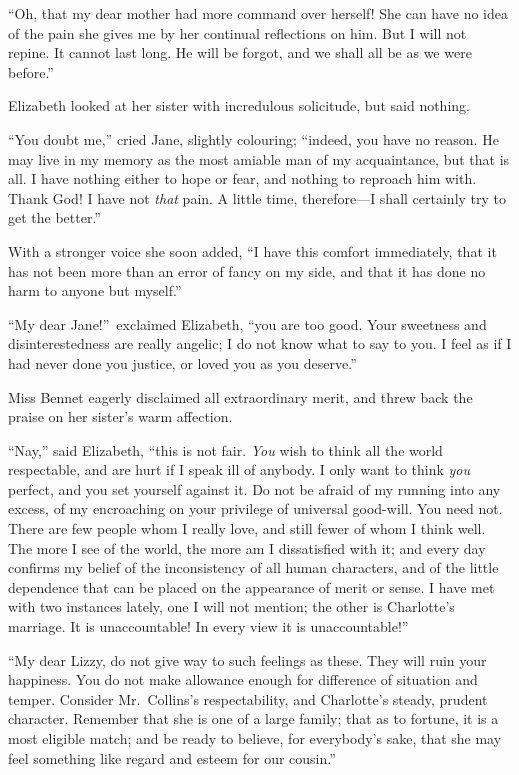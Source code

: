 \documentclass[12pt,english]{book}
\begin{document}
{}``Oh, that my dear mother had more command over herself! She can
have no idea of the pain she gives me by her continual reflections
on him. But I will not repine. It cannot last long. He will be forgot,
and we shall all be as we were before.''

Elizabeth looked at her sister with incredulous solicitude, but said
nothing.

{}``You doubt me,'' cried Jane, slightly colouring; {}``indeed,
you have no reason. He may live in my memory as the most amiable man
of my acquaintance, but that is all. I have nothing either to hope
or fear, and nothing to reproach him with. Thank God! I have not \textit{that}
pain. A little time, therefore\mbox{---}I shall certainly try to
get the better.''

With a stronger voice she soon added, {}``I have this comfort immediately,
that it has not been more than an error of fancy on my side, and that
it has done no harm to anyone but myself.''

{}``My dear Jane!''\ exclaimed Elizabeth, {}``you are too good.
Your sweetness and disinterestedness are really angelic; I do not
know what to say to you. I feel as if I had never done you justice,
or loved you as you deserve.''

Miss Bennet eagerly disclaimed all extraordinary merit, and threw
back the praise on her sister's warm affection.

{}``Nay,'' said Elizabeth, {}``this is not fair. \textit{You} wish
to think all the world respectable, and are hurt if I speak ill of
anybody. I only want to think \textit{you} perfect, and you set yourself
against it. Do not be afraid of my running into any excess, of my
encroaching on your privilege of universal good-will. You need not.
There are few people whom I really love, and still fewer of whom I
think well. The more I see of the world, the more am I dissatisfied
with it; and every day confirms my belief of the inconsistency of
all human characters, and of the little dependence that can be placed
on the appearance of merit or sense. I have met with two instances
lately, one I will not mention; the other is Charlotte's marriage.
It is unaccountable! In every view it is unaccountable!''\ 

{}``My dear Lizzy, do not give way to such feelings as these. They
will ruin your happiness. You do not make allowance enough for difference
of situation and temper. Consider Mr.\ Collins's respectability,
and Charlotte's steady, prudent character. Remember that she is one
of a large family; that as to fortune, it is a most eligible match;
and be ready to believe, for everybody's sake, that she may feel something
like regard and esteem for our cousin.''
\end{document}

